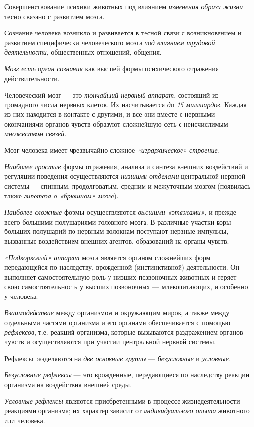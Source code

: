 \documentclass[a4paper,14pt,russian]{extreport}
\begin{document}
Совершенствование психики животных под влиянием \emph{изменения образа жизни} тесно связано с развитием мозга.

Сознание человека возникло и развивается в тесной связи с возникновением и развитием специфически человеческого мозга \emph{под влиянием трудовой деятельности}, общественных отношений, общения.

\emph{Мозг есть орган сознания} как высшей формы психического отражения действительности.

Человеческий мозг --- это \emph{тончайший нервный аппарат}, состоящий из громадного числа нервных клеток. Их насчитывается \emph{до 15 миллиардов}. Каждая из них находится в контакте с другими, и все они вместе с нервными окончаниями органов чувств образуют сложнейшую сеть с неисчислимым \emph{множеством связей}.

Мозг человека имеет чрезвычайно сложное \emph{«иерархическое» строение}.

\emph{Наиболее простые} формы отражения, анализа и синтеза внешних воздействий и регуляции поведения осуществляются \emph{низшими отделами} центральной нервной системы --- спинным, продолговатым, средним и межуточным мозгом (появилась также \emph{гипотеза о «брюшном» мозге}).

\emph{Наиболее сложные} формы осуществляются \emph{высшими «этажами»}, и прежде всего большими полушариями головного мозга. В различные участки коры больших полушарий по нервным волокнам поступают нервные импульсы, вызванные воздействием внешних агентов, образований на органы чувств.

\emph{«Подкорковый» аппарат} мозга является органом сложнейших форм передающейся по наследству, врожденной (инстинктивной) деятельности. Он выполняет самостоятельную роль у низших позвоночных животных и теряет свою самостоятельность у высших позвоночных --- млекопитающих, и особенно у человека.

\emph{Взаимодействие} между организмом и окружающим мирок, а также между отдельными частями организма и его органами обеспечивается с помощью \emph{рефлексов}, т.е. реакций организма, которые вызываются раздражением органов чувств и осуществляются при участии центральной нервной системы.

Рефлексы разделяются на \emph{две основные группы} --- \emph{безусловные} и \emph{условные.}

\emph{Безусловные рефлексы} --- это врожденные, передающиеся по наследству реакции организма на воздействия внешней среды.

\emph{Условные рефлексы} являются приобретенными в процессе жизнедеятельности реакциями организма; их характер зависит от \emph{индивидуального опыта} животного \textsc{или} человека.
\end{document}
